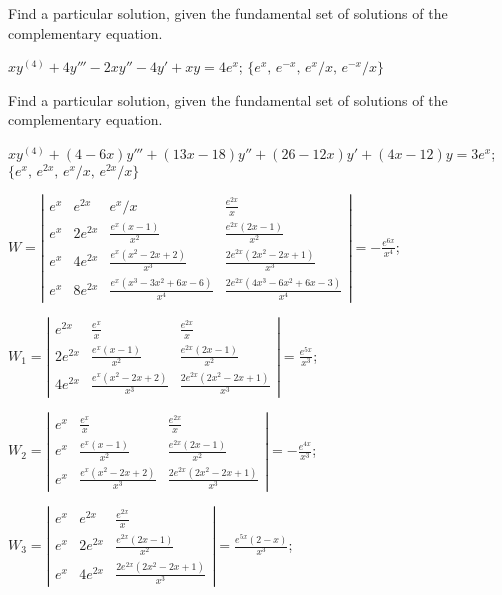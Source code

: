 \documentclass{ximera}
\begin{document}
\begin{problem}\label{exer:9.4.19}
Find a particular
solution, given the fundamental set of solutions of the complementary equation.

$xy^{(4)}+4y'''-2xy''-4y'+xy=4e^x$; \quad
$\{e^x,\,e^{-x},\,e^x/x,\,e^{-x}/x\}$
\end{problem}

\begin{problem}\label{exer:9.4.20}
Find a particular
solution, given the fundamental set of solutions of the complementary equation.

$xy^{(4)}+(4-6x)y'''+(13x-18)y''+(26-12x)y'+(4x-12)y=3e^x$; \quad
 $\{e^x,\,e^{2x},\,e^x/x,\,e^{2x}/x\}$

\begin{solution}
$W=\left|\begin{array}{cccc}
e^x&e^{2x}&e^x/x&\frac{e^{2x}}{x}\\
e^x&2e^{2x}&\frac{e^x(x-1)}{x^2}&\frac{e^{2x}(2x-1)}{x^2}\\
e^x&4e^{2x}&\frac{e^x(x^2-2x+2)}{x^3}&\frac{2e^{2x}(2x^2-2x+1)}{x^3}\\
e^x&8e^{2x}&\frac{e^x(x^3-3x^2+6x-6)}{x^4}
&\frac{2e^{2x}(4x^3-6x^2+6x-3)}{x^4}
\end{array}\right|=-\frac{e^{6x}}{x^4}$;

$W_1=\left|\begin{array}{cccc}
e^{2x}&\frac{e^x}{x}&\frac{e^{2x}}{x}\\
2e^{2x}&\frac{e^x(x-1)}{x^2}&\frac{e^{2x}(2x-1)}{x^2}\\
4e^{2x}&\frac{e^x(x^2-2x+2)}{x^3}&\frac{2e^{2x}(2x^2-2x+1)}{x^3}
\end{array}\right|=\frac{e^{5x}}{x^3}$;

$W_2=\left|\begin{array}{cccc}
e^x&\frac{e^x}{x}&\frac{e^{2x}}{x}\\
e^x&\frac{e^x(x-1)}{x^2}&\frac{e^{2x}(2x-1)}{x^2}\\
e^x&\frac{e^x(x^2-2x+2)}{x^3}&\frac{2e^{2x}(2x^2-2x+1)}{x^3}
\end{array}\right|=-\frac{e^{4x}}{x^3}$;

$W_3=\left|\begin{array}{cccc}
e^x&e^{2x}&\frac{e^{2x}}{x}\\
e^x&2e^{2x}&\frac{e^{2x}(2x-1)}{x^2}\\
e^x&4e^{2x}&\frac{2e^{2x}(2x^2-2x+1)}{x^3}
\end{array}\right|=\frac{e^{5x}(2-x)}{x^3}$;


\end{solution}
\end{problem}
\end{document}
